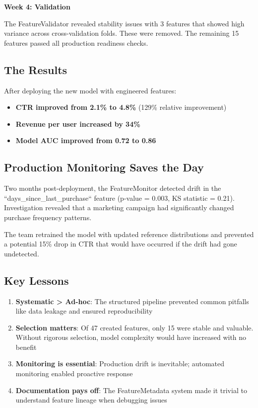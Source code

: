 \textbf{Week 4: Validation}

The FeatureValidator revealed stability issues with 3 features that showed high variance across cross-validation folds. These were removed. The remaining 15 features passed all production readiness checks.

\subsection{The Results}

After deploying the new model with engineered features:

\begin{itemize}
    \item \textbf{CTR improved from 2.1\% to 4.8\%} (129\% relative improvement)
    \item \textbf{Revenue per user increased by 34\%}
    \item \textbf{Model AUC improved from 0.72 to 0.86}
\end{itemize}

\subsection{Production Monitoring Saves the Day}

Two months post-deployment, the FeatureMonitor detected drift in the ``days\_since\_last\_purchase`` feature (p-value = 0.003, KS statistic = 0.21). Investigation revealed that a marketing campaign had significantly changed purchase frequency patterns.

The team retrained the model with updated reference distributions and prevented a potential 15\% drop in CTR that would have occurred if the drift had gone undetected.

\subsection{Key Lessons}

\begin{enumerate}
    \item \textbf{Systematic > Ad-hoc}: The structured pipeline prevented common pitfalls like data leakage and ensured reproducibility
    \item \textbf{Selection matters}: Of 47 created features, only 15 were stable and valuable. Without rigorous selection, model complexity would have increased with no benefit
    \item \textbf{Monitoring is essential}: Production drift is inevitable; automated monitoring enabled proactive response
    \item \textbf{Documentation pays off}: The FeatureMetadata system made it trivial to understand feature lineage when debugging issues
\end{enumerate}

